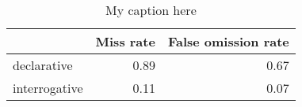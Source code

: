 \begin{table}[!ht]
\centering
\begin{tabular}{lrr}
\toprule
{} &  Miss rate &  False omission rate \\
\midrule
declarative   &       0.89 &                 0.67 \\
interrogative &       0.11 &                 0.07 \\
\bottomrule
\end{tabular}
\caption{My caption here}
\label{tab:INDICATIVE-ocd-combined-errors}
\end{table}